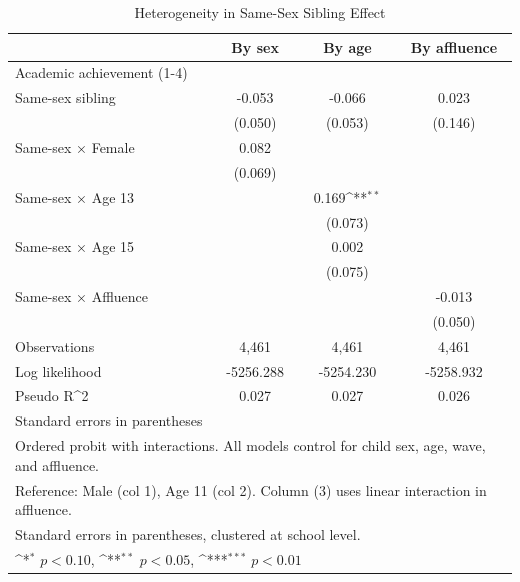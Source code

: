 \documentclass[12pt]{article}
\begin{document}
\begin{table}[htbp]\centering
\def\sym#1{\ifmmode^{#1}\else\(^{#1}\)\fi}
\caption{Heterogeneity in Same-Sex Sibling Effect\label{tab:heterogeneity}}
\begin{tabular}{l*{3}{c}}
\toprule
                &\multicolumn{1}{c}{By sex}&\multicolumn{1}{c}{By age}&\multicolumn{1}{c}{By affluence}\\
\midrule
Academic achievement (1-4)&                  &                  &                  \\
Same-sex sibling&   -0.053         &   -0.066         &    0.023         \\
                &  (0.050)         &  (0.053)         &  (0.146)         \\
Same-sex × Female&    0.082         &                  &                  \\
                &  (0.069)         &                  &                  \\
Same-sex × Age 13&                  &    0.169\sym{**} &                  \\
                &                  &  (0.073)         &                  \\
Same-sex × Age 15&                  &    0.002         &                  \\
                &                  &  (0.075)         &                  \\
Same-sex × Affluence&                  &                  &   -0.013         \\
                &                  &                  &  (0.050)         \\
\midrule
Observations    &    4,461         &    4,461         &    4,461         \\
Log likelihood  &-5256.288         &-5254.230         &-5258.932         \\
Pseudo R^2      &    0.027         &    0.027         &    0.026         \\
\bottomrule
\multicolumn{4}{l}{\footnotesize Standard errors in parentheses}\\
\multicolumn{4}{l}{\footnotesize Ordered probit with interactions. All models control for child sex, age, wave, and affluence.}\\
\multicolumn{4}{l}{\footnotesize Reference: Male (col 1), Age 11 (col 2). Column (3) uses linear interaction in affluence.}\\
\multicolumn{4}{l}{\footnotesize Standard errors in parentheses, clustered at school level.}\\
\multicolumn{4}{l}{\footnotesize \sym{*} \(p<0.10\), \sym{**} \(p<0.05\), \sym{***} \(p<0.01\)}\\
\end{tabular}
\end{table}
\end{document}
